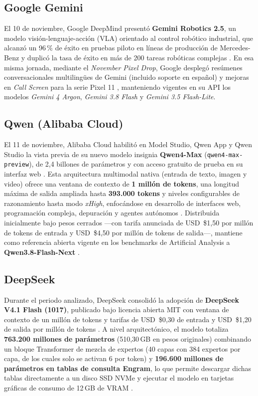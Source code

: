 \documentclass[conference,twocolumn,spanish]{IEEEtran}
\begin{document}
\subsection{Google Gemini}
El 10 de noviembre, Google DeepMind presentó \textbf{Gemini Robotics 2.5}, un modelo visión-lenguaje-acción (VLA) orientado al control robótico industrial, que alcanzó un 96\,\% de éxito en pruebas piloto en líneas de producción de Mercedes-Benz y duplicó la tasa de éxito en más de 200 tareas robóticas complejas \cite{google_robotics_2026}. En esa misma jornada, mediante el \textit{November Pixel Drop}, Google desplegó resúmenes conversacionales multilingües de Gemini (incluido soporte en español) y mejoras en \textit{Call Screen} para la serie Pixel 11 \cite{google_pixel_2026}, manteniendo vigentes en su API los modelos \textit{Gemini 4 Argon}, \textit{Gemini 3.8 Flash} y \textit{Gemini 3.5 Flash-Lite}.

\subsection{Qwen (Alibaba Cloud)}
El 11 de noviembre, Alibaba Cloud habilitó en Model Studio, Qwen App y Qwen Studio la vista previa de su nuevo modelo insignia \textbf{Qwen4-Max} (\texttt{qwen4-max-preview}), de 2,4 billones de parámetros y con acceso gratuito de prueba en su interfaz web \cite{qwen4_max_2026, llmmaster_qwen4_2026}. Esta arquitectura multimodal nativa (entrada de texto, imagen y video) ofrece una ventana de contexto de \textbf{1 millón de tokens}, una longitud máxima de salida ampliada hasta \textbf{393.000 tokens} y niveles configurables de razonamiento hasta modo \textit{xHigh}, enfocándose en desarrollo de interfaces web, programación compleja, depuración y agentes autónomos \cite{llmmaster_qwen4_2026}. Distribuida inicialmente bajo pesos cerrados —con tarifa anunciada de USD~\$1,50 por millón de tokens de entrada y USD~\$4,50 por millón de tokens de salida—, mantiene como referencia abierta vigente en los benchmarks de Artificial Analysis a \textbf{Qwen3.8-Flash-Next} \cite{qwen4_max_2026, aa_qwen38_2026}.

\subsection{DeepSeek}
Durante el periodo analizado, DeepSeek consolidó la adopción de \textbf{DeepSeek V4.1 Flash (1017)}, publicado bajo licencia abierta MIT con ventana de contexto de un millón de tokens y tarifas de USD~\$0,30 de entrada y USD~\$1,20 de salida por millón de tokens \cite{aa_deepseek_v41_2026, marfil_deepseek_2026}. A nivel arquitectónico, el modelo totaliza \textbf{763.200 millones de parámetros} (510,30\,GB en pesos originales) combinando un bloque Transformer de mezcla de expertos (40 capas con 384 expertos por capa, de los cuales solo se activan 6 por token) y \textbf{196.600 millones de parámetros en tablas de consulta Engram}, lo que permite descargar dichas tablas directamente a un disco SSD NVMe y ejecutar el modelo en tarjetas gráficas de consumo de 12\,GB de VRAM \cite{marfil_deepseek_2026}.
\end{document}
